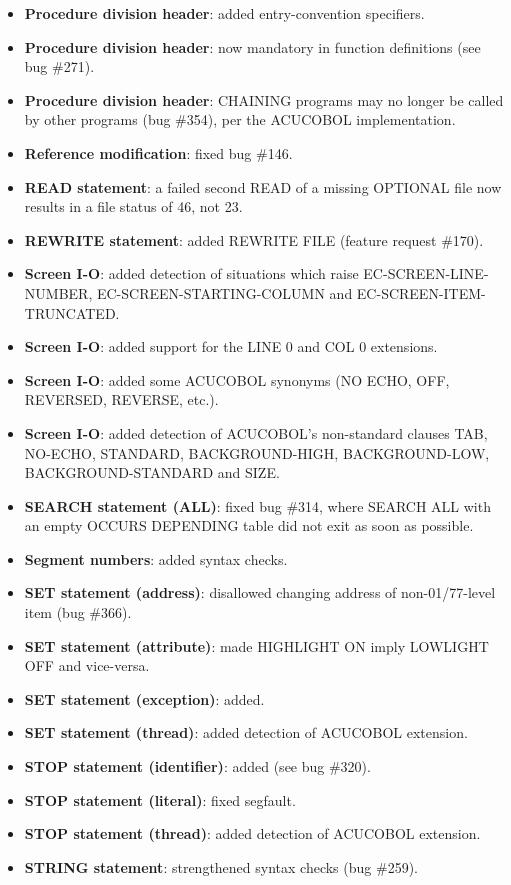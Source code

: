 \begin{itemize}
\item \textbf{Procedure division header}: added entry-convention specifiers.
\item \textbf{Procedure division header}: now mandatory in function definitions (see bug \#271).
\item \textbf{Procedure division header}: CHAINING programs may no longer be called by other programs (bug \#354), per the ACUCOBOL implementation.
\item \textbf{Reference modification}: fixed bug \#146.
\item \textbf{READ statement}: a failed second READ of a missing OPTIONAL file now results in a file status of 46, not 23.
\item \textbf{REWRITE statement}: added REWRITE FILE (feature request \#170).
\item \textbf{Screen I-O}: added detection of situations which raise EC-SCREEN-LINE-NUMBER, EC-SCREEN-STARTING-COLUMN and EC-SCREEN-ITEM-TRUNCATED.
\item \textbf{Screen I-O}: added support for the LINE 0 and COL 0 extensions.
\item \textbf{Screen I-O}: added some ACUCOBOL synonyms (NO ECHO, OFF, REVERSED, REVERSE, etc.).
\item \textbf{Screen I-O}: added detection of ACUCOBOL's non-standard clauses TAB, NO-ECHO, STANDARD, BACKGROUND-HIGH, BACKGROUND-LOW, BACKGROUND-STANDARD and SIZE.
\item \textbf{SEARCH statement (ALL)}: fixed bug \#314, where SEARCH ALL with an empty OCCURS DEPENDING table did not exit as soon as possible.
\item \textbf{Segment numbers}: added syntax checks.
\item \textbf{SET statement (address)}: disallowed changing address of non-01\slash{}77-level item (bug \#366).
\item \textbf{SET statement (attribute)}: made HIGHLIGHT ON imply LOWLIGHT OFF and vice-versa.
\item \textbf{SET statement (exception)}: added.
\item \textbf{SET statement (thread)}: added detection of ACUCOBOL extension.
\item \textbf{STOP statement (identifier)}: added (see bug \#320).
\item \textbf{STOP statement (literal)}: fixed segfault.
\item \textbf{STOP statement (thread)}: added detection of ACUCOBOL extension.
\item \textbf{STRING statement}: strengthened syntax checks (bug \#259).

\end{itemize}
